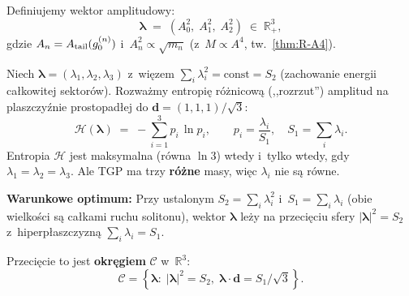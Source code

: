 \begin{definition}%
\label{def:R2-amplitude-vector}
Definiujemy wektor amplitudowy:
\begin{equation}\label{eq:R2-lambda-vec}
  \boldsymbol{\lambda} \;=\; (A_0^2,\; A_1^2,\; A_2^2)
  \;\in\; \mathbb{R}^3_+,
\end{equation}
gdzie $A_n = A_{\rm tail}(g_0^{(n)})$ i~$A_n^2 \propto \sqrt{m_n}$
(z~$M \propto A^4$, tw.~\ref{thm:R-A4}).
\end{definition}

\begin{proposition}[Optymalno\'s\'c entropijna $\Rightarrow$ $\mathrm{CV} = 1$]%
\label{prop:R2-entropy-CV1}
Niech $\boldsymbol{\lambda} = (\lambda_1, \lambda_2, \lambda_3)$
z~wi\k{e}zem $\sum_i \lambda_i^2 = \mathrm{const} = S_2$ (zachowanie
energii ca\l{}kowitej sektor\'ow).
Rozwa\.zmy entropi\k{e} r\'o\.znicow\k{a} (,,rozrzut'')
amplitud na plaszczy\'znie prostopad\l{}ej do
$\mathbf{d} = (1,1,1)/\sqrt{3}$:
\begin{equation}\label{eq:R2-entropy}
  \mathcal{H}(\boldsymbol{\lambda})
  \;=\; -\sum_{i=1}^3 p_i\,\ln p_i,
  \qquad
  p_i = \frac{\lambda_i}{S_1},\quad S_1 = \sum_i\lambda_i.
\end{equation}
Entropia $\mathcal{H}$ jest maksymalna (r\'owna $\ln 3$)
wtedy i~tylko wtedy, gdy $\lambda_1 = \lambda_2 = \lambda_3$.
Ale TGP ma trzy \textbf{r\'o\.zne} masy, wi\k{e}c $\lambda_i$
nie s\k{a} r\'owne.

\medskip\noindent
\textbf{Warunkowe optimum:}
Przy ustalonym $S_2 = \sum_i\lambda_i^2$ i~$S_1 = \sum_i\lambda_i$
(obie wielko\'sci s\k{a} ca\l{}kami ruchu solitonu),
wektor $\boldsymbol{\lambda}$ le\.zy na przeci\k{e}ciu
sfery $|\boldsymbol{\lambda}|^2 = S_2$
z~hiperpłaszczyzn\k{a} $\sum_i\lambda_i = S_1$.

Przeci\k{e}cie to jest \textbf{okr\k{e}giem} $\mathcal{C}$
w~$\mathbb{R}^3$:
\begin{equation}\label{eq:R2-circle}
  \mathcal{C} = \left\{\boldsymbol{\lambda}:\;
    |\boldsymbol{\lambda}|^2 = S_2,\;
    \boldsymbol{\lambda}\cdot\mathbf{d} = S_1/\sqrt{3}\right\}.
\end{equation}
\end{proposition}

